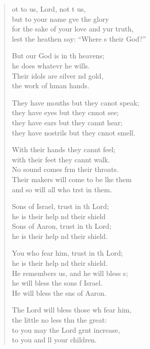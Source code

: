 \begin{verse}
  \begin{patverse}
ot to us, Lord, not t us,\Med\\
but to your name gve the glory\\
for the sake of your love and yur truth,\Med\\
lest the heathen say: “Where s their God?”

But our God is in th heavens;\Med\\
he does whatevr he wills.\\
Their idols are silver nd gold,\Med\\
the work of hman hands.

They have mouths but they canot speak;\Med\\
they have eyes but they cnnot see;\\
they have ears but they cannt hear;\Med\\
they have nostrils but they cnnot smell.

With their hands they cannt feel;\Flex\\
with their feet they cannt walk.\Med\\
No sound comes frm their throats.\\
Their makers will come to be l\pointup{\i}ke them\Med\\
and so will all who trst in them.

Sons of Israel, trust in th Lord;\Med\\
he is their help nd their shield\\
Sons of Aaron, trust in th Lord;\Med\\
he is their help nd their shield.

You who fear him, trust in th Lord;\Med\\
he is their help nd their shield.\\
He remembers us, and he will bless s;\Flex\\
he will bless the sons f Israel.\Med\\
He will bless the sns of Aaron.

The Lord will bless those wh fear him,\Med\\
the little no less thn the great:\\
to you may the Lord grnt increase,\Med\\
to you and ll your children.


\end{patverse}
\end{verse}
